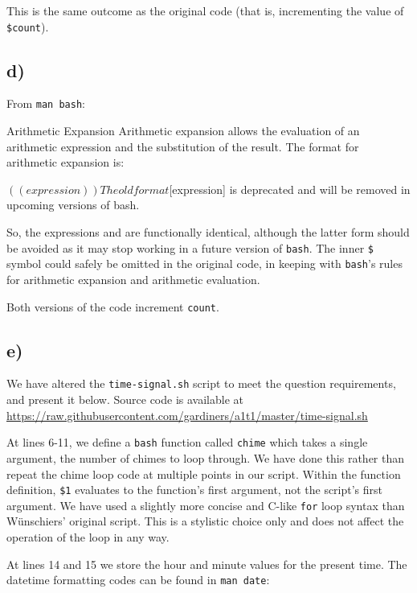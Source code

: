 \documentclass{article}
\begin{document}
This is the same outcome as the original code (that is, incrementing the value of \texttt{\$count}).

\subsection{d)}

From \texttt{man bash}:

\begin{bashinline}
Arithmetic Expansion
    Arithmetic expansion allows the evaluation of an arithmetic expression and the substitution of the result.  The format for arithmetic expansion is:

        $((expression))

    The old format $[expression] is deprecated and will be removed in upcoming versions of bash.
\end{bashinline}

So, the expressions  and \bashsnippet{$[$count+1]} are functionally identical, although the latter form should be avoided as it may stop working in a future version of \texttt{bash}. The inner \texttt{\$} symbol could safely be omitted in the original code, in keeping with \texttt{bash}'s rules for arithmetic expansion and arithmetic evaluation.

Both versions of the code increment \texttt{count}.

\subsection{e)}

We have altered the \texttt{time-signal.sh} script to meet the question requirements, and present it below. Source code is available at \url{https://raw.githubusercontent.com/gardiners/a1t1/master/time-signal.sh}


At lines 6-11, we define a \texttt{bash} function called \texttt{chime} which takes a single argument, the number of chimes to loop through. We have done this rather than repeat the chime loop code at multiple points in our script. Within the function definition, \texttt{\$1} evaluates to the function's first argument, not the script's first argument. We have used a slightly more concise and C-like \texttt{for} loop syntax than Wünschiers' original script. This is a stylistic choice only and does not affect the operation of the loop in any way.

At lines 14 and 15 we store the hour and minute values for the present time. The datetime formatting codes can be found in \texttt{man date}:
\end{document}
